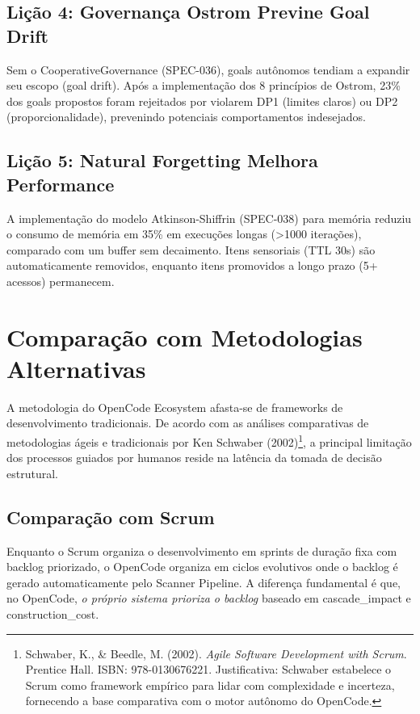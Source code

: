 \documentclass[12pt,a4paper,oneside]{abntex2}
\begin{document}
\begin{apendicesenv}
\subsection{Lição 4: Governança Ostrom Previne Goal Drift}

Sem o CooperativeGovernance (SPEC-036), goals autônomos tendiam a expandir seu escopo (goal drift). Após a implementação dos 8 princípios de Ostrom, 23\% dos goals propostos foram rejeitados por violarem DP1 (limites claros) ou DP2 (proporcionalidade), prevenindo potenciais comportamentos indesejados.

\subsection{Lição 5: Natural Forgetting Melhora Performance}

A implementação do modelo Atkinson-Shiffrin (SPEC-038) para memória reduziu o consumo de memória em 35\% em execuções longas (>1000 iterações), comparado com um buffer sem decaimento. Itens sensoriais (TTL 30s) são automaticamente removidos, enquanto itens promovidos a longo prazo (5+ acessos) permanecem.

\section{Comparação com Metodologias Alternativas}

A metodologia do OpenCode Ecosystem afasta-se de frameworks de desenvolvimento tradicionais. De acordo com as análises comparativas de metodologias ágeis e tradicionais por Ken Schwaber (2002)\footnote{Schwaber, K., \& Beedle, M. (2002). \textit{Agile Software Development with Scrum}. Prentice Hall. ISBN: 978-0130676221. Justificativa: Schwaber estabelece o Scrum como framework empírico para lidar com complexidade e incerteza, fornecendo a base comparativa com o motor autônomo do OpenCode.}, a principal limitação dos processos guiados por humanos reside na latência da tomada de decisão estrutural.

\subsection{Comparação com Scrum}

Enquanto o Scrum organiza o desenvolvimento em sprints de duração fixa com backlog priorizado, o OpenCode organiza em ciclos evolutivos onde o backlog é gerado automaticamente pelo Scanner Pipeline. A diferença fundamental é que, no OpenCode, \textit{o próprio sistema prioriza o backlog} baseado em cascade\_impact e construction\_cost.


\end{apendicesenv}
\end{document}
